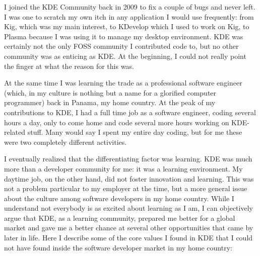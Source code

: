

\noindent{}I joined the KDE Community back in 2009 to fix a couple of bugs and
never left. I was one to scratch my own itch in any application I
would use frequently: from Kig, which was my main interest, to KDevelop
which I used to work on Kig, to Plasma because I was using it to
manage my desktop environment. KDE was certainly not the only
FOSS community I contributed code to, but no other community was as
enticing as KDE. At the beginning, I could not really point the
finger at what the reason for this was.

At the same time I was learning the trade as a professional software
engineer (which, in my culture is nothing but a name for a glorified
computer programmer) back in Panama, my home country. At the peak of
my contributions to KDE, I had a full time job as a software engineer,
coding several hours a day, only to come home and code several more
hours working on KDE-related stuff. Many would say I spent my entire
day coding, but for me these were two completely different activities.

I eventually realized that the differentiating factor was
learning. KDE was much more than a developer community for me: it was
a learning environment. My daytime job, on the other hand, did not
foster innovation and learning. This was not a problem particular to
my employer at the time, but a more general issue about the culture
among software developers in my home country. While I understand not
everybody is as excited about learning as I am, I can objectively
argue that KDE, as a learning community, prepared me better for a
global market and gave me a better chance at several other
opportunities that came by later in life. Here I describe some of the
core values I found in KDE that I could not have found inside the
software developer market in my home country:

